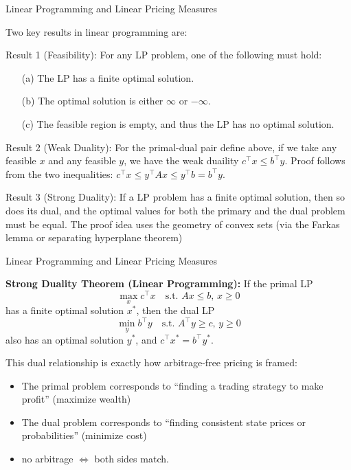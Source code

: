 \documentclass{beamer}
\begin{document}
\begin{frame}{Linear Programming and Linear Pricing Measures}

    {\footnotesize \footnotesize
    Two key results in linear programming are:

\par Result 1 (Feasibility): For any LP problem, one of the following must hold:
\begin{enumerate}
\item[(a)] The LP has a finite optimal solution.
\item[(b)] The optimal solution is either $\infty$ or $-\infty$.
\item[(c)] The feasible region is empty, and thus the LP has no optimal solution.
\end{enumerate}
\vspace{1em}
\par Result 2 (Weak Duality): For the primal-dual pair define above, if we take any feasible $x$
and any feasible $y$, we have the weak duaility $c^\top x\leq b^\top y$. Proof follows from the two inequalities:
$ c^\top x\leq y^\top Ax \leq y^\top b = b^\top y$.
\vspace{1em}
\par Result 3 (Strong Duality):
If a LP problem has a finite optimal solution, then so does its dual,
 and the optimal values for both the primary and the dual problem must be equal.
 The proof idea uses the geometry of convex sets (via the Farkas lemma or separating hyperplane theorem)


    }
\end{frame}

\begin{frame}{Linear Programming and Linear Pricing Measures}

    {\footnotesize \footnotesize
    \par \textbf{Strong Duality Theorem (Linear Programming):}
    If the primal LP
    \[
    \max_{x} c^{\top} x \quad \text{s.t. } Ax \leq b, \, x \geq 0
    \]
    has a finite optimal solution $x^*$, then the dual LP
    \[
    \min_{y} b^{\top} y \quad \text{s.t. } A^{\top} y \geq c, \, y \geq 0
    \]
    also has an optimal solution $y^*$, and $ c^{\top} x^* = b^{\top} y^*.$
    \vspace{1em}
    \par This dual relationship is exactly how arbitrage-free pricing is framed:
    \begin{itemize}
        \item  The primal problem corresponds to ``finding a trading strategy to make profit'' (maximize wealth)
        \item  The dual problem corresponds to ``finding consistent state prices or probabilities'' (minimize cost)
        \item  no arbitrage $\Leftrightarrow$ both sides match.
    \end{itemize}
    }
\end{frame}
\end{document}
